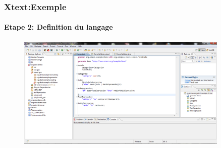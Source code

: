 \documentclass{beamer}
\begin{document}
	\begin{frame}
	\frametitle{Xtext:Exemple}\framesubtitle{Etape 2: Definition du langage}
	\begin{figure}[h]
	\centering
			\includegraphics[width=0.90\textwidth]{2.PNG}
	\label{fig:2}
\end{figure}

\end{frame} 
\end{document}
